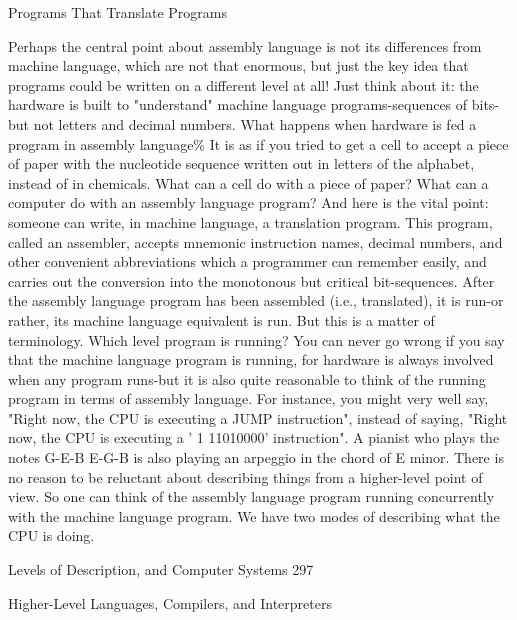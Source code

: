                               Programs That Translate Programs

       Perhaps the central point about assembly language is not its differences from
       machine language, which are not that enormous, but just the key idea that
       programs could be written on a different level at all! Just think about it: the
       hardware is built to "understand" machine language programs-sequences of bits-
       but not letters and decimal numbers. What happens when hardware is fed a
       program in assembly language\% It is as if you tried to get a cell to accept a piece
       of paper with the nucleotide sequence written out in letters of the alphabet, instead
       of in chemicals. What can a cell do with a piece of paper? What can a computer
       do with an assembly language program?
               And here is the vital point: someone can write, in machine language, a
       translation program. This program, called an assembler, accepts mnemonic
       instruction names, decimal numbers, and other convenient abbreviations which a
       programmer can remember easily, and carries out the conversion into the
       monotonous but critical bit-sequences. After the assembly language program has
       been assembled (i.e., translated), it is run-or rather, its machine language
       equivalent is run. But this is a matter of terminology. Which level program is
       running? You can never go wrong if you say that the machine language program
       is running, for hardware is always involved when any program runs-but it is also
       quite reasonable to think of the running program in terms of assembly language.
       For instance, you might very well say, "Right now, the CPU is executing a JUMP
       instruction", instead of saying, "Right now, the CPU is executing a ' 1 11010000'
       instruction". A pianist who plays the notes G-E-B E-G-B is also playing an
       arpeggio in the chord of E minor. There is no reason to be reluctant about
       describing things from a higher-level point of view. So one can think of the
       assembly language program running concurrently with the machine language
       program. We have two modes of describing what the CPU is doing.




Levels of Description, and Computer Systems                                             297

                        Higher-Level Languages, Compilers, and Interpreters

